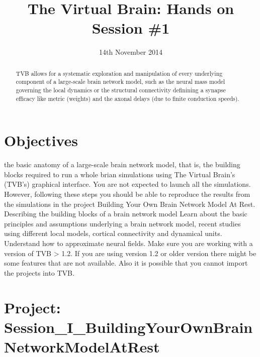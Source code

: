 \documentclass{tufte-handout}
\title{The Virtual Brain: Hands on Session \#1}
\date{14th November 2014}
\begin{document}

\newpage
\ClearWallPaper
\begin{abstract}
\noindent TVB allows for a systematic exploration and manipulation of every
underlying component of a large-scale brain network model, such as the neural
mass model governing the local dynamics  or the structural connectivity
definining a synapse efficacy like metric (weights) and the axonal delays (due to finite conduction speeds).
\begin{marginfigure}%
  \label{fig:marginfig}
\end{marginfigure}
\end{abstract}

\section{Objectives}\label{sec:objectives}

 the basic anatomy of a large-scale brain network model, that is, the building blocks  required to run a whole brian simulations using The
Virtual Brain's (TVB's) graphical interface. You are not expected to launch all the simulations. However, following these steps you should
be able to reproduce the results from the simulations in the project Building 
Your Own Brain Network Model At Rest. Describing the building blocks of a brain network model
Learn about the basic principles and assumptions underlying a brain network model, recent studies using different local models, cortical connectivity and dynamical units. Understand how to approximate neural fields. Make sure you are working with a version of TVB > 1.2. If you are using version 1.2 or older version there might be some features that are not available. Also it is possible that you cannot import the projects into TVB. 


\section{Project:  Session\_I\_BuildingYourOwnBrainNetworkModelAtRest}\label{sec:project_data}
\end{document}
